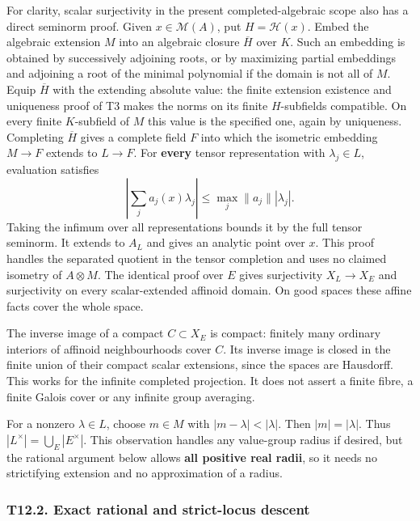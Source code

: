 \documentclass[
  10pt,
]{article}
\begin{document}
For clarity, scalar surjectivity in the present completed-algebraic
scope also has a direct seminorm proof. Given \(x\in\mathcal M(A)\), put
\(H=\mathcal H(x)\). Embed the algebraic extension \(M\) into an
algebraic closure \(\overline H\) over \(K\). Such an embedding is
obtained by successively adjoining roots, or by maximizing partial
embeddings and adjoining a root of the minimal polynomial if the domain
is not all of \(M\). Equip \(\overline H\) with the extending absolute
value: the finite extension existence and uniqueness proof of T3 makes
the norms on its finite \(H\)-subfields compatible. On every finite
\(K\)-subfield of \(M\) this value is the specified one, again by
uniqueness. Completing \(\overline H\) gives a complete field \(F\) into
which the isometric embedding \(M\to F\) extends to \(L\to F\). For
\textbf{every} tensor representation with \(\lambda_j\in L\), evaluation
satisfies \[
 \left|\sum_j a_j(x)\lambda_j\right|
       \le \max_j\|a_j\||\lambda_j|.
                                                               \tag{31}
\] Taking the infimum over all representations bounds it by the full
tensor seminorm. It extends to \(A_L\) and gives an analytic point over
\(x\). This proof handles the separated quotient in the tensor
completion and uses no claimed isometry of \(A\otimes M\). The identical
proof over \(E\) gives surjectivity \(X_L\to X_E\) and surjectivity on
every scalar-extended affinoid domain. On good spaces these affine facts
cover the whole space.

The inverse image of a compact \(C\subset X_E\) is compact: finitely
many ordinary interiors of affinoid neighbourhoods cover \(C\). Its
inverse image is closed in the finite union of their compact scalar
extensions, since the spaces are Hausdorff. This works for the infinite
completed projection. It does not assert a finite fibre, a finite Galois
cover or any infinite group averaging.

For a nonzero \(\lambda\in L\), choose \(m\in M\) with
\(|m-\lambda|<|\lambda|\). Then \(|m|=|\lambda|\). Thus
\(|L^\times|=\bigcup_E|E^\times|\). This observation handles any
value-group radius if desired, but the rational argument below allows
\textbf{all positive real radii}, so it needs no strictifying extension
and no approximation of a radius.

\subsubsection{T12.2. Exact rational and strict-locus
descent}\label{t12.2.-exact-rational-and-strict-locus-descent}
\end{document}
